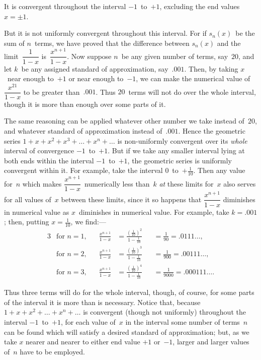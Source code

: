 \documentclass[12pt,leqno]{book}[2005/09/16]
\newcommand{\Typo}[2]{#2}
\newcommand{\Chg}[2]{#2}
\newcommand{\Add}[1]{\Chg{}{#1}}
\newcommand{\PageSep}[1]{\ignorespaces}
\begin{document}
It is convergent throughout the interval
$-1$~to~$+1$, excluding the end values $x = ±1$.

But it is not uniformly convergent throughout
this interval. For if $s_{n}(x)$~be the sum of
$n$~terms, we have proved that the difference
between $s_{n}(x)$ and the limit~$\dfrac{1}{1 - x}$ is~$\dfrac{x^{n+1}}{1 - x}$.
Now suppose $n$~be any given number of terms,
say~$20$, and let $k$~be any assigned standard
of approximation, say~$.001$. Then, by taking
$x$~near enough to~$+1$ or near enough to~$-1$,
we can make the numerical value of~$\dfrac{x^{21}}{1 - x}$ to
be greater than~$.001$. Thus $20$~terms will
\PageSep{209}
not do over the whole interval, though it is
more than enough over some parts of it.

The same reasoning can be applied whatever
other number we take instead of~$20$,
and whatever standard of approximation instead
of~$.001$. Hence the geometric series
$1 + x + x^{2} + x^{3} + \dots + x^{n} + \dots$ is non-uniformly
convergent over its \emph{whole} interval of
convergence $-1$~to~$+1$. But if we take any
smaller interval lying at both ends within the
interval $-1$~to~$+1$, the geometric series is
uniformly convergent within it. For example,
take the interval $0$~to~$+\frac{1}{10}$. Then any
value for~$n$ which makes $\dfrac{x^{n+1}}{1 - x}$~numerically
less than~$k$ \emph{at} these limits for~$x$ also serves
for all values of~$x$ between these limits, since
it so happens that $\dfrac{x^{n+1}}{1 - x}$ diminishes in numerical
value as $x$~diminishes in numerical value.
For example, take $k = .001$; then, putting
$x = \frac{1}{10}$, we find:\Add{---}
\begin{alignat*}{3}
&\text{for $n = 1$,}\quad & \frac{x^{n+1}}{1 - x}
  &= \frac{(\frac{1}{10})^{2}}{1 - \frac{1}{10}}
  &&= \tfrac{1}{90} = .0111\dots, \\
%
&\text{for $n = 2$,}\quad & \frac{x^{n+1}}{1 - x}
  &= \frac{(\frac{1}{10})^{3}}{1 - \frac{1}{10}}
  &&= \tfrac{1}{900} = .00111\dots, \\
%
&\text{for $n = 3$,}\quad & \frac{x^{n+1}}{1 - x}
  &= \frac{(\frac{1}{10})^{4}}{1 - \frac{1}{10}}
  &&= \tfrac{1}{9000} = .000111\dots\Typo{,}{.}
\end{alignat*}

Thus three terms will do for the whole interval,
\PageSep{210}
though, of course, for some parts of
the interval it is more than is necessary.
Notice that, because $1 + x + x^{2} + \dots + x^{n} + \dots$
is convergent (though not uniformly)
throughout the interval $-1$~to~$+1$,
for each value of~$x$ in the interval some number
of terms~$n$ can be found which will satisfy
a desired standard of approximation; but,
as we take $x$ nearer and nearer to either end
value $+1$ or~$-1$, larger and larger values of~$n$
have to be employed.
\end{document}
